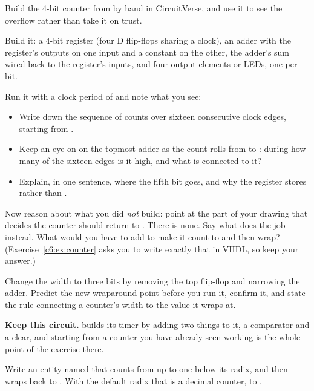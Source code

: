 \label{c6:ex:counterhand}
Build the 4-bit counter from  by hand in CircuitVerse, and use it to see the
overflow rather than take it on trust.

 Build it: a 4-bit register (four D flip-flops sharing a clock), an adder with the
register's outputs on one input and a constant  on the other, the adder's sum wired back to
the register's  inputs, and four output elements or LEDs, one per bit.

 Run it with a clock period of  and note what you see:
\begin{itemize}
  \item Write down the sequence of counts over sixteen consecutive clock edges, starting from
    .
  \item Keep an eye on  on the topmost adder as the count rolls from  to
    : during how many of the sixteen edges is it high, and what is connected to it?
  \item Explain, in one sentence, where the fifth bit goes, and why the register stores 
    rather than .
\end{itemize}

 Now reason about what you did \emph{not} build: point at the part of your drawing that
decides the counter should return to . There is none. Say what does the job instead. What
would you have to add to make it count  to  and then wrap?
(Exercise~\ref{c6:ex:counter} asks you to write exactly that in VHDL, so keep your answer.)

 Change the width to three bits by removing the top flip-flop and narrowing the adder.
Predict the new wraparound point before you run it, confirm it, and state the rule connecting a
counter's width to the value it wraps at.

\textbf{Keep this circuit.}  builds its timer by adding two things to it, a
comparator and a clear, and starting from a counter you have already seen working is the whole point
of the exercise there.

\label{c6:ex:counter}
Write an entity named  that counts from  up to one below its radix, and then
wraps back to . With the default radix that is a decimal counter,  to .

